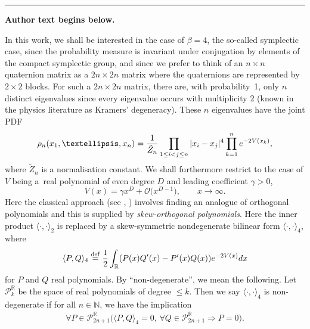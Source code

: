 \documentclass[11pt]{article}
\numberwithin{equation}{section}
\numberwithin{equation}{section}
\begin{document}
\medskip\hrule\medskip\noindent\textbf{Author text begins below.}\par
\setcounter{section}{1}\setcounter{equation}{1}
In this work, we shall be interested in the case of $\beta = 4$, the so-called symplectic case, since the probability measure is invariant under conjugation by elements of the compact symplectic group, and since we prefer to think of an $n\times n$ quaternion matrix as a $2n \times 2n$ matrix where the quaternions are represented by $2 \times 2$ blocks. For such a $2n \times 2n$ matrix, there are, with probability~1, only $n$ distinct eigenvalues since every eigenvalue occurs with multiplicity $2$ (known in the physics literature as Kramers' degeneracy). These $n$ eigenvalues have the joint PDF
\begin{align}\label{pointprocess}
\rho_n(x_1, \dots, x_n) = \frac{1}{\tilde{Z}_n} \prod_{1 \leq i < j \leq n}|x_i - x_j|^4 \prod_{k=1}^{n} {\rm e}^{-2V(x_k)},
\end{align}
where $\tilde{Z}_n $ is a normalisation constant. We shall furthermore restrict to the case of $V$ being a~real polynomial of even degree $D$ and leading coefficient $\gamma > 0$,
\[
V(x) = \gamma x^D + \mathcal{O}\big(x^{D-1}\big),\qquad x \to \infty.
\]
Here the classical approach (see \cite[Chapter 5]{mehta}, \cite[Chapter 6]{loggases}) involves finding an analogue of orthogonal polynomials and this is supplied by \textit{skew-orthogonal polynomials}. Here the inner product $\langle \cdot, \cdot \rangle_2$ is replaced by a skew-symmetric nondegenerate bilinear form $\langle \cdot, \cdot \rangle_4$, where
\begin{equation}\label{skewprod}
\langle P, Q \rangle_4 \overset{\mathrm{def}}{=} \frac{1}{2} \int_{\mathbb{R}} ( P(x) Q^\prime(x)-P^\prime(x) Q(x) ) {\rm e}^{-2V(x)} {\rm d}x
\end{equation}
for $P$ and $Q$ real polynomials. By \enquote{non-degenerate}, we mean the following. Let $\mathscr{P}_k^\mathbb{R}$ be the space of real polynomials of degree $\leq k$. Then we say $\langle \cdot, \cdot \rangle_4$ is non-degenerate if for all $n \in \mathbb{N}$, we have the implication
\begin{align*}
\forall P \in \mathscr{P}_{2n+1}^\mathbb{R} \big( \langle P, Q \rangle_4 = 0,\, \forall Q \in \mathscr{P}_{2n+1}^\mathbb{R} \Longrightarrow P = 0\big).
\end{align*}
\end{document}
